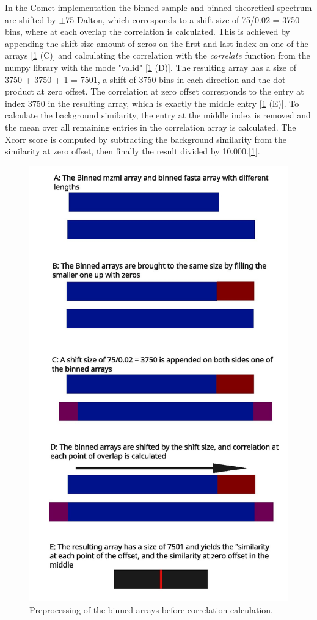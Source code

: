 \documentclass[11pt]{article}
\begin{document}
In the Comet implementation the binned sample and binned theoretical spectrum are shifted by $\pm$75 Dalton, which corresponds to a shift size of 75/0.02 = 3750 bins, where at each overlap the correlation is calculated. This is achieved by appending the shift size amount of zeros on the first and last index on one of the arrays [\cref{fig:corr} (C)] and calculating the correlation with the \textit{correlate} function from the numpy library with the mode "valid" [\cref{fig:corr} (D)]. The resulting array has a size of 3750 + 3750 + 1 = 7501, a shift of 3750 bins in each direction and the dot product at zero offset. The correlation at zero offset corresponds to the entry at index 3750 in the resulting array, which is exactly the middle entry [\cref{fig:corr} (E)]. To calculate the background similarity, the entry at the middle index is removed and the mean over all remaining entries in the correlation array is calculated. The Xcorr score is computed by subtracting the background similarity from the similarity at zero offset, then finally the result divided by 10.000.[\cref{fig:corr}].
\begin{figure}
\includegraphics[width=\linewidth]{figs/crosscorr.jpg} 
\caption{Preprocessing of the binned arrays before correlation calculation.}
\label{fig:corr}
\end{figure}
\end{document}
